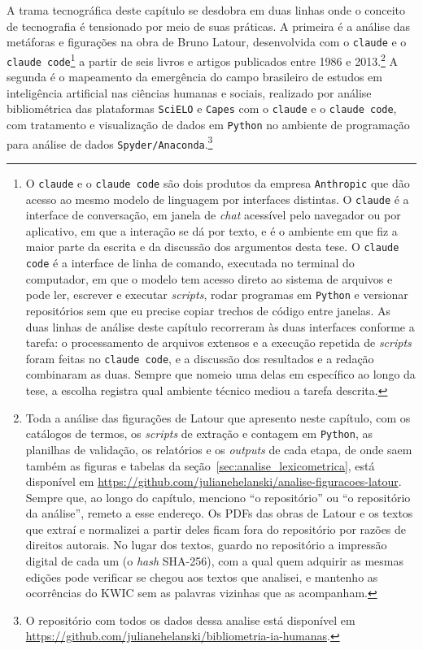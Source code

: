 A trama tecnográfica deste capítulo se desdobra em duas linhas onde o conceito de tecnografia é tensionado por meio de suas práticas. A primeira é a análise das metáforas e figurações na obra de Bruno Latour, desenvolvida com o \texttt{claude} e o \texttt{claude code}\footnote{O \texttt{claude} e o \texttt{claude code} são dois produtos da empresa \texttt{Anthropic} que dão acesso ao mesmo modelo de linguagem por interfaces distintas. O \texttt{claude} é a interface de conversação, em janela de \emph{chat} acessível pelo navegador ou por aplicativo, em que a interação se dá por texto, e é o ambiente em que fiz a maior parte da escrita e da discussão dos argumentos desta tese. O \texttt{claude code} é a interface de linha de comando, executada no terminal do computador, em que o modelo tem acesso direto ao sistema de arquivos e pode ler, escrever e executar \emph{scripts}, rodar programas em \texttt{Python} e versionar repositórios sem que eu precise copiar trechos de código entre janelas. As duas linhas de análise deste capítulo recorreram às duas interfaces conforme a tarefa: o processamento de arquivos extensos e a execução repetida de \emph{scripts} foram feitas no \texttt{claude code}, e a discussão dos resultados e a redação combinaram as duas. Sempre que nomeio uma delas em específico ao longo da tese, a escolha registra qual ambiente técnico mediou a tarefa descrita.} a partir de seis livros e artigos publicados entre 1986 e 2013.\footnote{Toda a análise das figurações de Latour que apresento neste capítulo, com os catálogos de termos, os \emph{scripts} de extração e contagem em \texttt{Python}, as planilhas de validação, os relatórios e os \emph{outputs} de cada etapa, de onde saem também as figuras e tabelas da seção~\ref{sec:analise_lexicometrica}, está disponível em \url{https://github.com/julianehelanski/analise-figuracoes-latour}. Sempre que, ao longo do capítulo, menciono \enquote{o repositório} ou \enquote{o repositório da análise}, remeto a esse endereço. Os PDFs das obras de Latour e os textos que extraí e normalizei a partir deles ficam fora do repositório por razões de direitos autorais. No lugar dos textos, guardo no repositório a impressão digital de cada um (o \emph{hash} SHA-256), com a qual quem adquirir as mesmas edições pode verificar se chegou aos textos que analisei, e mantenho as ocorrências do KWIC sem as palavras vizinhas que as acompanham.} A segunda é o mapeamento da emergência do campo brasileiro de estudos em inteligência artificial nas ciências humanas e sociais, realizado por análise bibliométrica das plataformas \texttt{SciELO} e \texttt{Capes} com o \texttt{claude} e o \texttt{claude code}, com tratamento e visualização de dados em \texttt{Python} no ambiente de programação para análise de dados \texttt{Spyder/Anaconda}.\footnote{O repositório com todos os dados dessa analise está disponível em \url{https://github.com/julianehelanski/bibliometria-ia-humanas}.}
        
